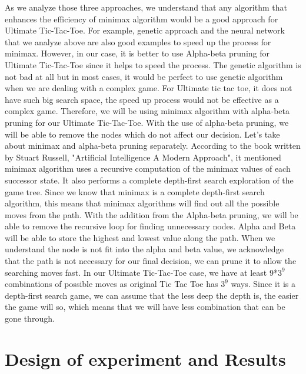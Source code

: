 \documentclass[12pt]{article}
\begin{document}
As we analyze those three approaches, we understand that any algorithm that enhances the efficiency of minimax algorithm would be a good approach for Ultimate Tic-Tac-Toe. For example, genetic approach and the neural network that we analyze above are also good examples to speed up the process for minimax. However, in our case, it is better to use Alpha-beta pruning for Ultimate Tic-Tac-Toe since it helps to speed the process. The genetic algorithm is not bad at all but in most cases, it would be perfect to use genetic algorithm when we are dealing with a complex game. For Ultimate tic tac toe, it does not have such big search space, the speed up process would not be effective as a complex game. Therefore, we will be using minimax algorithm with alpha-beta pruning for our Ultimate Tic-Tac-Toe. With the use of alpha-beta pruning, we will be able to remove the nodes which do not affect our decision. Let's take about minimax and alpha-beta pruning separately. According to the book written by Stuart Russell, "Artificial Intelligence A Modern Approach", it mentioned minimax algorithm uses a recursive computation of the minimax values of each successor state. It also performs a complete depth-first search exploration of the game tree. Since we know that minimax is a complete depth-first search algorithm, this means that minimax algorithms will find out all the possible moves from the path. With the addition from the Alpha-beta pruning, we will be able to remove the recursive loop for finding unnecessary nodes. Alpha and Beta will be able to store the highest and lowest value along the path. When we understand the node is not fit into the alpha and beta value, we acknowledge that the path is not necessary for our final decision, we can prune it to allow the searching moves fast. In our Ultimate Tic-Tac-Toe case, we have at least 9*$3^9$ combinations of possible moves as original Tic Tac Toe has $3^9$ ways. Since it is a depth-first search game, we can assume that the less deep the depth is, the easier the game will so, which means that we will have less combination that can be gone through.
\section{Design of experiment and Results}
\end{document}

